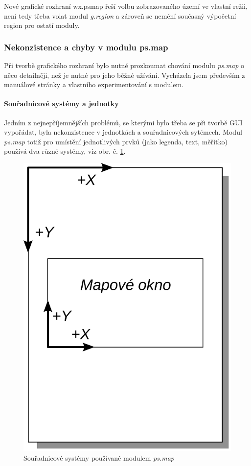 \documentclass[a4paper,12pt,draft]{article}
\newcommand{\modul}[1]{\emph{#1}}
\begin{document}
Nové grafické rozhraní wx.psmap řeší volbu zobrazovaného území ve
vlastní režii, není tedy třeba volat modul \modul{g.region} a zároveň
se nemění současný výpočetní region pro ostatí moduly. %

\subsubsection{Nekonzistence a chyby v modulu ps.map}
\label{sec:psmap:chyby}
Při tvorbě grafického rozhraní bylo nutné prozkoumat chování
modulu \modul{ps.map} o něco detailněji, než je nutné pro jeho běžné
užívání. Vycházela jsem především z manuálové stránky \cite{manual}
a vlastního experimentování s modulem.

\paragraph*{Souřadnicové systémy a jednotky}
\label{sec:psmap:sour_systemy}
Jedním z nejnepříjemnějších problémů, se kterými bylo třeba se při
tvorbě GUI vypořádat, byla nekonzistence v jednotkách a souřadnicových
sytémech. Modul \modul{ps.map} totiž pro umístění jednotlivých prvků
(jako legenda, text, měřítko) používá dva různé systémy, viz
obr. č. \ref{fig:sour_systemy}.

\begin{figure}[h!]
    \centering
    \includegraphics[width=0.2\textheight]{sour_systemy.pdf}
    \caption{Souřadnicové systémy používané modulem
    \modul{ps.map}\label{fig:sour_systemy}}
\end{figure}
\end{document}
